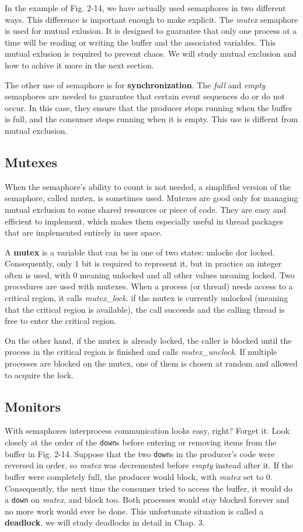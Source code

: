 \documentclass{book}
\newcommand {\kw}  [1] {\textbf{#1}}
\newcommand {\sys} [1] {\textsl{#1}}
\newcommand {\cmd} [1] {\texttt{#1}}
\begin{document}
In the example of Fig. 2-14, we have actually used semaphores in two different ways.
This difference is important enough to make explicit.
The \sys{mutex} semaphore is used for mutual exlusion.
It is designed to guarantee that only one process at a time will be reading or writing the buffer and the associated variables.
This mutual exlusion is required to prevent chaos.
We will study mutual exclusion and how to achive it more in the next section.

The other use of semaphore is for \kw{synchronization}.
The \sys{full} and \sys{empty} semaphores are needed to guarantee that certain event sequences do or do not occur.
In this case, they ensure that the producer stops running when the buffer is full, and the consumer stops running when it is empty.
This use is differnt from mutual exclusion.

\subsection{Mutexes}
When the semaphore's ability to count is not needed, a simplified version of the semaphore, called mutex, is sometimes used.
Mutexes are good only for managing mutual exclusion to some shared resources or piece of code.
They are easy and efficient to implement, which makes them especially useful in thread packages that are implemented entirely in user space.

A \kw{mutex} is a variable that can be in one of two states: unlocke dor locked.
Consequently, only 1 bit is required to represent it, but in practice an integer often is used, 
with 0 meaning unlocked and all other values meaning locked.
Two procedures are used with mutexes.
When a process (or thread) needs access to a critical region, it calls \sys{mutex\_lock}.
if the mutex is currently unlocked (meaning that the critical region is available),
the call succeeds and the calling thread is free to enter the critical region.

On the other hand, if the mutex is already locked, the caller is blocked until the process in the critical region is finished 
and calls \sys{mutex\_unclock}.
If multiple processes are blocked on the mutex, one of them is chosen at random and allowed to acquire the lock.

\subsection{Monitors}
With semaphores interprocess communication looks easy, right? Forget it.
Look closely at the order of the \cmd{down}s before entering or removing items from the buffer in Fig. 2-14.
Suppose that the two \cmd{down}s in the producer's code were reversed in order, 
so \sys{mutex} was decremented before \sys{empty} instead after it.
If the buffer were completely full, the producer would block, with \sys{mutex} set to 0.
Consequently, the next time the consumer tried to access the buffer, it would do a \cmd{down} on \sys{mutex}, and block too.
Both processes would stay blocked forever and no more work would ever be done.
This unfortunate situation is called a \kw{deadlock}.
we will study deadlocks in detail in Chap. 3.
\end{document}
